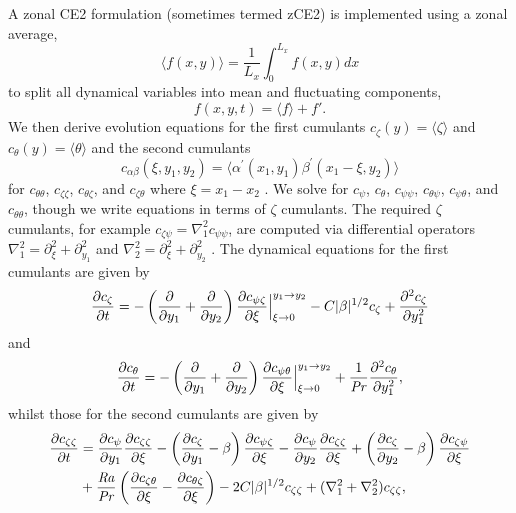 \documentclass{jfm}
\newcommand{\cz}{c_{\zeta}}
\newcommand{\cs}{c_{\psi}}
\newcommand{\ct}{c_{\theta}}
\newcommand{\css}{c_{\psi \psi}}
\newcommand{\csz}{c_{\psi \zeta}}
\newcommand{\czs}{c_{\zeta \psi}}
\newcommand{\czz}{c_{\zeta \zeta}}
\newcommand{\ctz}{c_{\theta \zeta}}
\newcommand{\czt}{c_{\zeta \theta}}
\newcommand{\ctt}{c_{\theta \theta}}
\newcommand{\cst}{c_{\psi \theta}}
\newcommand{\cts}{c_{\theta \psi}}
\newcommand{\Rayleigh}{\mbox{\textit{Ra}}}  %
\begin{document}
A zonal CE2 formulation (sometimes termed zCE2) is implemented using a zonal average, 
\begin{equation}
\langle f(x,y) \rangle = \frac{1}{L_x} \int_0^{L_x} f(x,y) dx
\end{equation}
to split all dynamical variables into mean and fluctuating components,
\begin{equation}
    f(x,y,t) = \langle f \rangle + f'.
\end{equation}
We then derive evolution equations for the first cumulants $\cz(y) = \langle \zeta \rangle $ and $\ct(y) = \langle \theta \rangle$ and the second cumulants 
\begin{equation}
    c_{\alpha\beta}(\xi,y_1,y_2) = \langle \alpha^\prime(x_1,y_1) \beta^\prime(x_1-\xi,y_2) \rangle
\end{equation}
for $\ctt$, $\czz$, $\ctz$, and $\czt$ where $\xi = x_1 - x_2$ . 
We solve for $\cs$, $\ct$, $\css$, $\cts$, $\cst$, and $\ctt$, though we write equations in terms of $\zeta$ cumulants.
The required $\zeta$ cumulants, for example $\czs = \nabla^2_1 \css$, are computed via differential operators $\nabla^2_1 = \partial_\xi^2 + \partial_{y_1}^2$ and $\nabla^2_2 = \partial_\xi^2 + \partial_{y_2}^2$ \citep[as in][]{2013PhRvL.110j4502T}.
The  dynamical equations for the first cumulants are given by
\begin{equation}
  \label{eq:cz}
  \pdv{\cz}{t} = - \left(\pdv{}{y_1} + \pdv{}{y_2}\right) \pdv{\csz}{\xi}\Big|_{\xi \to 0}^{y_1 \to y_2} - C |\beta|^{1/2} \cz + \pdv[2]{\cz}{y_1}
\end{equation}
and
\begin{equation}
  \label{eq:ct}
  \pdv{\ct}{t} = - \left(\pdv{}{y_1} + \pdv{}{y_2}\right) \pdv{\cst}{\xi} \Big|_{\xi \to 0}^{y_1 \to y_2} + \frac{1}{\Pran} \pdv[2]{\ct}{y_1},
\end{equation}
whilst those for the second cumulants are given by
\begin{equation}
  \label{eq:czz}
  \begin{split}
    \pdv{\czz}{t} &= \pdv{\cs}{y_1} \pdv{\czz}{\xi} - \left(\pdv{\cz}{y_1} - \beta\right) \pdv{\csz}{\xi} - \pdv{\cs}{y_2} \pdv{\czz}{\xi}  + \left(\pdv{\cz}{y_2} - \beta\right) \pdv{\czs}{\xi}\\
    &+ \frac{\Rayleigh}{\Pran} \left(\pdv{\czt}{\xi} -  \pdv{\ctz}{\xi}\right) - 2C |\beta|^{1/2} \czz + (\nabla_1^2 + \nabla_2^2) \czz,    
  \end{split}
\end{equation}
\end{document}
